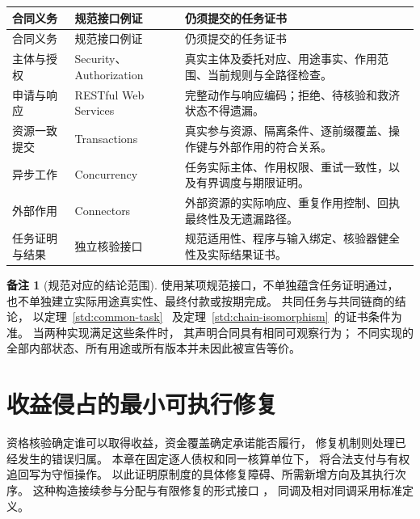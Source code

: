 \documentclass[UTF8,12pt,a4paper,openany,fontset=none,zihao=false]{ctexrep}
\theoremstyle{definition}
\newtheorem{remark}{备注}[chapter]
\newcommand{\1}{\mathbf 1}
\begin{document}
\begingroup
\small
\renewcommand{\arraystretch}{1.14}
\begin{longtable}{p{}p{}p{}}
\toprule
合同义务 & 规范接口例证 & 仍须提交的任务证书\\
\midrule
\endfirsthead
\toprule
合同义务 & 规范接口例证 & 仍须提交的任务证书\\
\midrule
\endhead
主体与授权 &
Security、Authorization &
真实主体及委托对应、用途事实、作用范围、当前规则与全路径检查。\\
申请与响应 &
RESTful Web Services &
完整动作与响应编码；拒绝、待核验和救济状态不得遗漏。\\
资源一致提交 &
Transactions &
真实参与资源、隔离条件、逐前缀覆盖、操作键与外部作用的符合关系。\\
异步工作 &
Concurrency &
任务实际主体、作用权限、重试一致性，以及有界调度与期限证明。\\
外部作用 &
Connectors &
外部资源的实际响应、重复作用控制、回执最终性及无遗漏路径。\\
任务证明与结果 &
独立核验接口 &
规范适用性、程序与输入绑定、核验器健全性及实际结果证书。\\
\bottomrule
\end{longtable}
\endgroup

\begin{remark}[规范对应的结论范围]
使用某项规范接口，不单独蕴含任务证明通过，
也不单独建立实际用途真实性、最终付款或按期完成。
共同任务与共同链商的结论，
以定理~\ref{std:common-task}~
及定理~\ref{std:chain-isomorphism}~的证书条件为准。
当两种实现满足这些条件时，
其声明合同具有相同可观察行为；
不同实现的全部内部状态、所有用途或所有版本并未因此被宣告等价。
\end{remark}

\chapter{收益侵占的最小可执行修复}
\label{r:chapter}

资格核验确定谁可以取得收益，资金覆盖确定承诺能否履行，
修复机制则处理已经发生的错误归属。
本章在固定逐人债权和同一核算单位下，
将合法支付与有权追回写为守恒操作。
以此证明原制度的具体修复障碍、所需新增方向及其执行次序。
这种构造接续参与分配与有限修复的形式接口
\cite{InternalEconomics}，
同调及相对同调采用标准定义\cite{Hatcher2002}。
\end{document}
